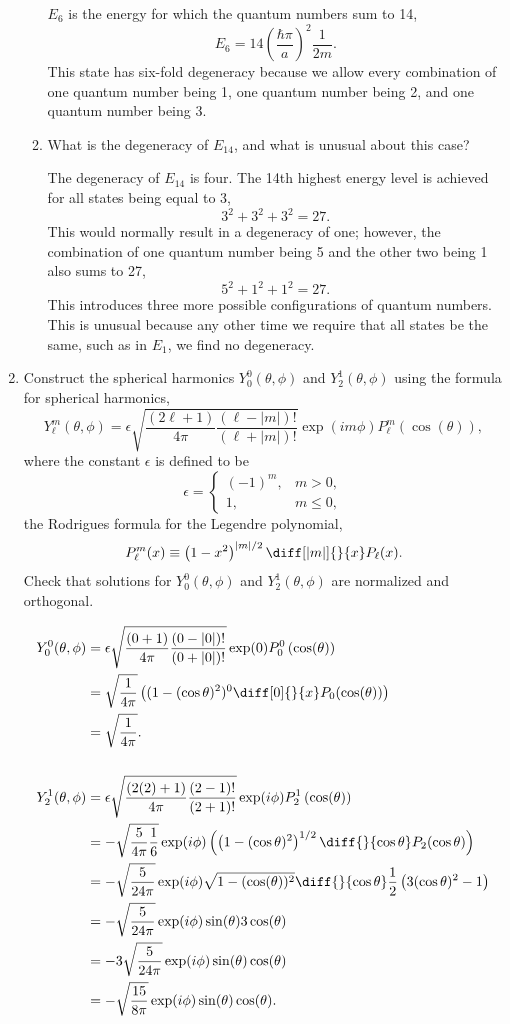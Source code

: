 \documentclass[a4paper, 12pt]{config/homework}
\begin{document}
\begin{enumerate}
\begin{enumerate}[label=(\alph*.)]
\(E_6\) is the energy for which the quantum numbers sum to 14,
\[E_6 = 14 \left(\frac{\hbar\pi}{a}\right)^2\frac{1}{2m}.\]
This state has six-fold degeneracy because we allow every combination of one quantum number being 1, one quantum number being 2, and one quantum number being 3.

\item What is the degeneracy of \(E_{14}\), and what is unusual about this case?

The degeneracy of \(E_{14}\) is four. The 14th highest energy level is achieved for all states being equal to 3,
\[3^2 + 3^2 + 3^2 = 27.\]
This would normally result in a degeneracy of one; however, the combination of one quantum number being 5 and the other two being 1 also sums to 27,
\[5^2 + 1^2 + 1^2 = 27.\]
This introduces three more possible configurations of quantum numbers. This is unusual because any other time we require that all states be the same, such as in \(E_1\), we find no degeneracy.

\end{enumerate}
\pagebreak
\item Construct the spherical harmonics \(Y_0^0(\theta,\phi)\) and \(Y_2^1(\theta,\phi)\) using the formula for spherical harmonics,
\[Y_\ell^m(\theta,\phi) = \epsilon\sqrt{\frac{(2\ell+1)}{4\pi}\frac{(\ell-|m|)!}{(\ell+|m|)!}}\exp(im\phi)P_\ell^m\left(\cos(\theta)\right),\]
where the constant \(\epsilon\) is defined to be
\[\epsilon = \begin{cases}
(-1)^m, & m > 0, \\ 1, & m \le 0,
\end{cases}\]
the Rodrigues formula for the Legendre polynomial,
\[P_\ell^m(x) \equiv \left(1-x^2\right)^{|m|/2}\diff[|m|]{}{x}P_\ell(x).\]
Check that solutions for \(Y_0^0(\theta,\phi)\) and \(Y_2^1(\theta,\phi)\) are normalized and orthogonal.

\begin{align*}
Y_0^0(\theta, \phi) &= \epsilon\sqrt{\frac{(0+1)}{4\pi}\frac{(0-|0|)!}{(0+|0|)!}}\exp(0)P_0^0\left(\cos(\theta)\right)
\\&= \sqrt{\frac{1}{4\pi}}\left((1-(\cos\theta)^2)^0\diff[0]{}{x}P_0(\cos(\theta))\right)
\\&= \sqrt{\frac{1}{4\pi}}.
\\&\\
Y_2^1(\theta, \phi) &= \epsilon \sqrt{\frac{(2(2)+1)}{4\pi}\frac{(2-1)!}{(2+1)!}}\exp(i\phi)P_2^1\left(\cos(\theta)\right)
\\&= -\sqrt{\frac{5}{4\pi}\frac{1}{6}}\exp(i\phi)
\left( \left(1-(\cos\theta)^2\right)^{1/2} \diff{}{\cos\theta}P_2(\cos\theta) \right)
\\&= -\sqrt{\frac{5}{24\pi}}\exp(i\phi) \sqrt{1-(\cos(\theta))^2} \diff{}{\cos\theta}\frac{1}{2}\left(3(\cos\theta)^2-1\right)
\\&= -\sqrt{\frac{5}{24\pi}}\exp(i\phi)\sin(\theta)3\cos(\theta)
\\&= -3\sqrt{\frac{5}{24\pi}}\exp(i\phi)\sin(\theta)\cos(\theta)
\\&= -\sqrt{\frac{15}{8\pi}}\exp(i\phi)\sin(\theta)\cos(\theta).
\end{align*}


\end{enumerate}
\end{document}
